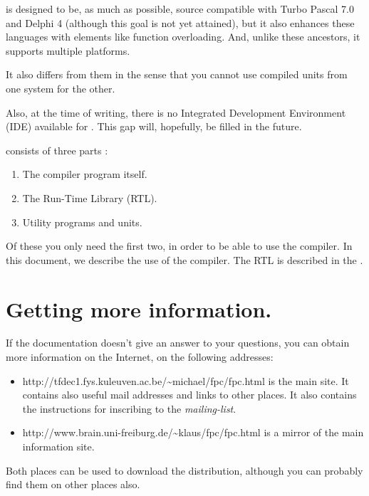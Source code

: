 \documentclass{report}
\begin{document}
\fpc is designed to be, as much as possible, source compatible with 
Turbo Pascal 7.0 and Delphi 4 (although this goal is not yet attained), 
but it also enhances these languages with elements like function overloading.
And, unlike these ancestors, it supports multiple platforms.

It also differs from them in the sense that you cannot use compiled units
from one system for the other.

Also, at the time of writing, there is no Integrated Development Environment
(IDE) available for \fpc. This gap will, hopefully, be filled in the future.

\fpc consists of three parts :
\begin{enumerate}
\item The compiler program itself.
\item The Run-Time Library (RTL).
\item Utility programs and units.
\end{enumerate}

Of these you only need the first two, in order to be able to use the compiler.
In this document, we describe the use of the compiler. The RTL is described in the
.

\section{Getting more information.}
If the documentation doesn't give an answer to your questions, 
you can obtain more information on the Internet, on the following addresses:
\begin{itemize}
\item
{}
{http://tfdec1.fys.kuleuven.ac.be/\~{}michael/fpc/fpc.html} is the main
site. It contains also useful mail addresses and
links to other places. 
It also contains the instructions for inscribing to the
\textit{mailing-list}.

\item
{}
{http://www.brain.uni-freiburg.de/\~{}klaus/fpc/fpc.html} is a mirror
of the main \fpc information site.  
\end{itemize}
Both places can be used to download the \fpc distribution, although you can 
probably find them on other places also.
\end{document}
